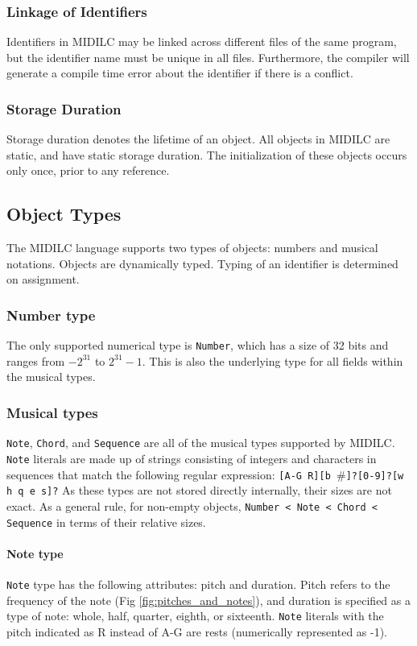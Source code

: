 \documentclass[12pt,A4]{book}
\begin{document}
\subsubsection{Linkage of Identifiers}
Identifiers in MIDILC may be linked across different files of the same program, but the identifier name must be unique in all files. Furthermore, the compiler will generate a compile time error about the identifier if there is a conflict.
\subsubsection{Storage Duration}
Storage duration denotes the lifetime of an object. All objects in MIDILC are static, and have static storage duration. The initialization of these objects occurs only once, prior to any reference.
\subsection{Object Types}
The MIDILC language supports two types of objects: numbers and musical notations.  Objects are dynamically typed.  Typing of an identifier is determined on assignment.
\subsubsection{Number type}
The only supported numerical type is \verb|Number|, which has a size of 32 bits and ranges from $-2^{31}$ to $2^{31} - 1$.  This is also the underlying type for all fields within the musical types.
\subsubsection{Musical types}
\verb|Note|, \verb|Chord|, and \verb|Sequence| are all of the musical types supported by MIDILC. \verb|Note| literals are  made up of strings consisting of integers and characters in sequences that match the following regular expression:
\verb|[A-G R][b |\#\verb|]?[0-9]?[w h q e s]?|
As these types are not stored directly internally, their sizes are not exact. As a general rule, for non-empty objects,
\verb|Number < Note < Chord < Sequence| in terms of their relative sizes.
\paragraph{Note type}
\verb|Note| type has the following attributes: pitch and duration. Pitch refers to the frequency of the note (Fig \ref{fig:pitches_and_notes}), and duration is specified as a type of note: whole, half, quarter, eighth, or sixteenth.  \verb|Note| literals with the pitch indicated as R instead of A-G are rests (numerically represented as -1).
\end{document}
